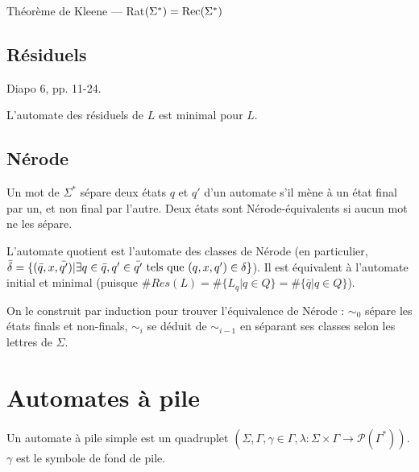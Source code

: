 \documentclass[a4paper]{article}
\begin{document}
\begin{prop}
Théorème de Kleene --- Rat$(\Sigma^*) = \textnormal{Rec}(\Sigma^*)$
\end{prop}

\subsection{Résiduels}

Diapo 6, pp. 11-24.

\begin{prop}
L'automate des résiduels de $L$ est minimal pour $L$.
\end{prop}

\subsection{Nérode}

\begin{defi}
Un mot de $\Sigma^*$ sépare deux états $q$ et $q'$ d'un automate s'il mène à un état final par un, et non final par l'autre. Deux états sont Nérode-équivalents si aucun mot ne les sépare.
\end{defi}

\begin{defi}
L'automate quotient est l'automate des classes de Nérode (en particulier, $\bar{\delta} = \{(\bar{q},x,\bar{q'})|\exists q\in\bar{q}, q'\in\bar{q'} \textnormal{ tels que } (q,x,q')\in\delta\}$). Il est équivalent à l'automate initial et minimal (puisque $\#Res(L)=\#\{L_q|q\in Q\}=\#\{\bar{q}|q\in Q\}$).
\end{defi}

On le construit par induction pour trouver l'équivalence de Nérode : $\sim_0$ sépare les états finals et non-finals, $\sim_i$ se déduit de $\sim_{i-1}$ en séparant ses classes selon les lettres de $\Sigma$.


\section{Automates à pile}

\begin{defi}
Un automate à pile simple est un quadruplet $(\Sigma, \Gamma, \gamma\in\Gamma, \lambda :\Sigma\times\Gamma\rightarrow\mathcal{P}(\Gamma^*))$. $\gamma$ est le symbole de fond de pile.
\end{defi}
\end{document}
